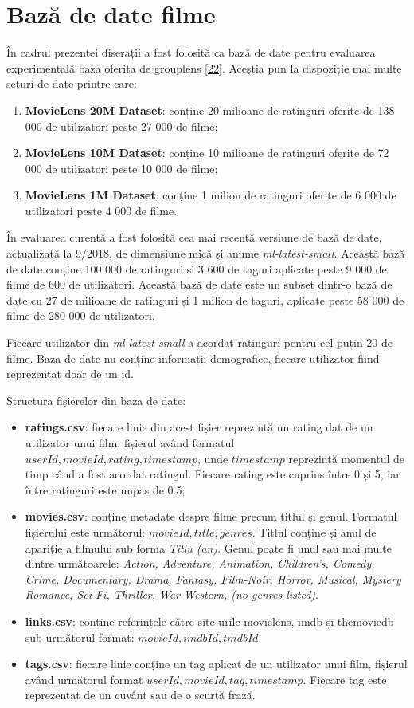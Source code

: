 \section{Bază de date filme}
În cadrul prezentei diserații a fost folosită ca bază de date pentru evaluarea experimentală baza oferita de grouplens \hyperlink{movielens}{[22]}. Aceștia pun la dispoziție mai multe seturi de date printre care:
\begin{enumerate}
	\item \textbf{MovieLens 20M Dataset}: conține 20 milioane de ratinguri oferite de 138 000 de utilizatori peste 27 000 de filme;
	\item \textbf{MovieLens 10M Dataset}: conține 10 milioane de ratinguri oferite de 72 000 de utilizatori peste 10 000 de filme;
	\item \textbf{MovieLens 1M Dataset}: conține 1 milion de ratinguri oferite de 6 000 de utilizatori peste 4 000 de filme.
\end{enumerate}

În evaluarea curentă a fost folosită cea mai recentă versiune de bază de date, actualizată la 9/2018, de dimensiune mică și anume \textit{ml-latest-small}. Această bază de date conține 100 000 de ratinguri și 3 600 de taguri aplicate peste 9 000 de filme de 600 de utilizatori. Această bază de date este un subset dintr-o bază de date cu 27 de milioane de ratinguri și 1 milion de taguri, aplicate peste 58 000 de filme de 280 000 de utilizatori.

Fiecare utilizator din \textit{ml-latest-small} a acordat ratinguri pentru cel puțin 20 de filme. Baza de date nu conține informații demografice, fiecare utilizator fiind reprezentat doar de un id.

Structura fișierelor din baza de date:
\begin{itemize}
	\item \textbf{ratings.csv}: fiecare linie din acest fișier reprezintă un rating dat de un utilizator unui film, fișierul având formatul $userId, movieId, rating, timestamp$, unde $timestamp$ reprezintă momentul de timp când a fost acordat ratingul. Fiecare rating este cuprins între 0 și 5, iar între ratinguri este unpas de 0.5;
	\item \textbf{movies.csv}: conține metadate despre filme precum titlul și genul. Formatul fișierului este următorul: $movieId, title, genres$. Titlul conține și anul de apariție a filmului sub forma \textit{Titlu (an)}. Genul poate fi unul sau mai multe dintre următoarele: \textit{Action, Adventure, Animation, Children's, Comedy, Crime, Documentary, Drama, Fantasy, Film-Noir, Horror, Musical, Mystery Romance, Sci-Fi, Thriller, War Western, (no genres listed)}.
	\item \textbf{links.csv}: conține referințele către site-urile movielens, imdb și themoviedb sub următorul format: $movieId,imdbId,tmdbId$.
	\item \textbf{tags.csv}: fiecare linie conține un tag aplicat de un utilizator unui film, fișierul având următorul format $userId,movieId,tag,timestamp$. Fiecare tag este reprezentat de un cuvânt sau de o scurtă frază.
\end{itemize}

